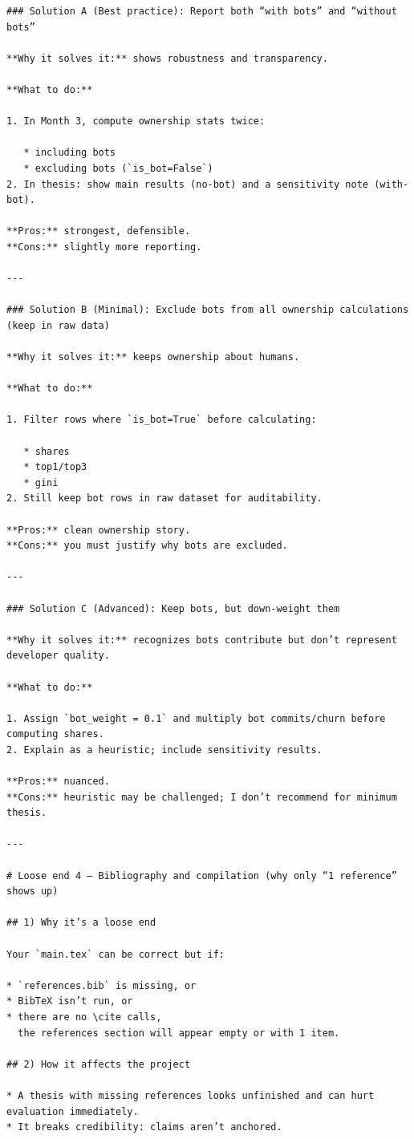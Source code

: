 \documentclass[11pt,a4paper]{article}
\begin{document}
\begin{verbatim}
### Solution A (Best practice): Report both “with bots” and “without bots”

**Why it solves it:** shows robustness and transparency.

**What to do:**

1. In Month 3, compute ownership stats twice:

   * including bots
   * excluding bots (`is_bot=False`)
2. In thesis: show main results (no-bot) and a sensitivity note (with-bot).

**Pros:** strongest, defensible.
**Cons:** slightly more reporting.

---

### Solution B (Minimal): Exclude bots from all ownership calculations (keep in raw data)

**Why it solves it:** keeps ownership about humans.

**What to do:**

1. Filter rows where `is_bot=True` before calculating:

   * shares
   * top1/top3
   * gini
2. Still keep bot rows in raw dataset for auditability.

**Pros:** clean ownership story.
**Cons:** you must justify why bots are excluded.

---

### Solution C (Advanced): Keep bots, but down-weight them

**Why it solves it:** recognizes bots contribute but don’t represent developer quality.

**What to do:**

1. Assign `bot_weight = 0.1` and multiply bot commits/churn before computing shares.
2. Explain as a heuristic; include sensitivity results.

**Pros:** nuanced.
**Cons:** heuristic may be challenged; I don’t recommend for minimum thesis.

---

# Loose end 4 — Bibliography and compilation (why only “1 reference” shows up)

## 1) Why it’s a loose end

Your `main.tex` can be correct but if:

* `references.bib` is missing, or
* BibTeX isn’t run, or
* there are no \cite calls,
  the references section will appear empty or with 1 item.

## 2) How it affects the project

* A thesis with missing references looks unfinished and can hurt evaluation immediately.
* It breaks credibility: claims aren’t anchored.


\end{verbatim}
\end{document}
